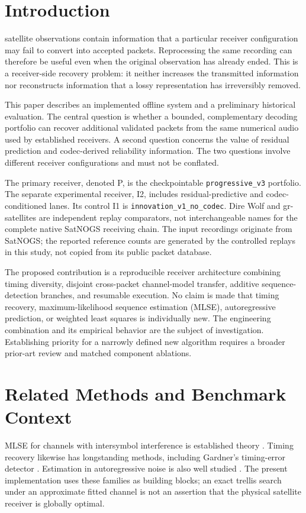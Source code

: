 \documentclass{ieeeaccess}
\begin{document}
\section{Introduction}
 satellite observations contain information that a particular receiver configuration may fail to convert into accepted packets. Reprocessing the same recording can therefore be useful even when the original observation has already ended. This is a receiver-side recovery problem: it neither increases the transmitted information nor reconstructs information that a lossy representation has irreversibly removed.

This paper describes an implemented offline system and a preliminary historical evaluation. The central question is whether a bounded, complementary decoding portfolio can recover additional validated packets from the same numerical audio used by established receivers. A second question concerns the value of residual prediction and codec-derived reliability information. The two questions involve different receiver configurations and must not be conflated.

The primary receiver, denoted P, is the checkpointable \texttt{progressive\_v3} portfolio. The separate experimental receiver, I2, includes residual-predictive and codec-conditioned lanes. Its control I1 is \texttt{innovation\_v1\_no\_codec}. Dire Wolf and gr-satellites are independent replay comparators, not interchangeable names for the complete native SatNOGS receiving chain. The input recordings originate from SatNOGS; the reported reference counts are generated by the controlled replays in this study, not copied from its public packet database.

The proposed contribution is a reproducible receiver architecture combining timing diversity, disjoint cross-packet channel-model transfer, additive sequence-detection branches, and resumable execution. No claim is made that timing recovery, maximum-likelihood sequence estimation (MLSE), autoregressive prediction, or weighted least squares is individually new. The engineering combination and its empirical behavior are the subject of investigation. Establishing priority for a narrowly defined new algorithm requires a broader prior-art review and matched component ablations.

\section{Related Methods and Benchmark Context}
MLSE for channels with intersymbol interference is established theory \cite{forney1972}. Timing recovery likewise has longstanding methods, including Gardner's timing-error detector \cite{gardner1986}. Estimation in autoregressive noise is also well studied \cite{kay1994}. The present implementation uses these families as building blocks; an exact trellis search under an approximate fitted channel is not an assertion that the physical satellite receiver is globally optimal.
\end{document}
